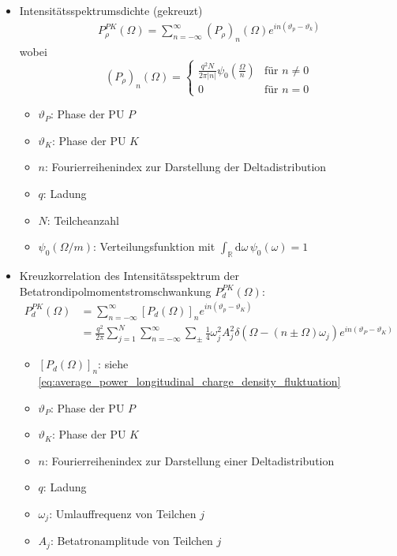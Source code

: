 \documentclass[12pt]{article}%
\renewcommand{\theta}{\vartheta}
\begin{document}
\begin{itemize}
\begin{itemize}
	\end{itemize}

\item Intensitätsspektrumsdichte (gekreuzt)
\begin{align}
P_\rho^{PK}(\Omega) = \sum_{n = -\infty}^{\infty} (P_\rho)_n(\Omega) e^{in(\theta_p - \theta_k)}
\end{align}
wobei \[
\left( P_\rho \right)_n (\Omega) = \begin{cases}
	\frac{q^2N}{2\pi |n|} \psi_0\left(\frac{\Omega}{n} \right) & \textrm{für } n \neq 0\\
	0 & \text{für } n = 0
	
\end{cases}
\]

	\begin{itemize}
	\item $\theta_P$: Phase der PU $P$
	\item $\theta_K$: Phase der PU $K$
	\item $n$: Fourierreihenindex zur Darstellung der Deltadistribution
	\item $q$: Ladung
	\item $N$: Teilcheanzahl
	\item $\psi_0(\Omega / m)$: Verteilungsfunktion mit $\int_{\mathbb{R}}\mathrm{d}\omega \, \psi_0(\omega) = 1$
	\end{itemize}

\item Kreuzkorrelation des Intensitätsspektrum der Betatrondipolmomentstromschwankung $P^{PK}_d(\Omega)$:
\begin{subequations}
\begin{align}
P_d^{PK}(\Omega) &= \sum_{n=-\infty}^{\infty} [P_d(\Omega)]_n e^{in(\theta_p - \theta_K)} \\
&= \frac{q^2}{2\pi} \sum_{j=1}^{N}\sum_{n=-\infty}^{\infty}\sum_{\pm} \frac{1}{4} \omega_j^2 A_j^2 \delta(\Omega - (n \pm \Omega) \omega_j) e^{in(\theta_P - \theta_K)}
\end{align}
\end{subequations}

	\begin{itemize}
	\item $[P_d(\Omega)]_n$: siehe \eqref{eq:average_power_longitudinal_charge_density_fluktuation}
	\item $\theta_P$: Phase der PU $P$
	\item $\theta_K$: Phase der PU $K$
	\item $n$: Fourierreihenindex zur Darstellung einer Deltadistribution
	\item $q$: Ladung
	\item $\omega_j$: Umlauffrequenz von Teilchen $j$
	\item $A_j$: Betatronamplitude von Teilchen $j$
	\end{itemize}
	

\end{itemize}
\end{document}
